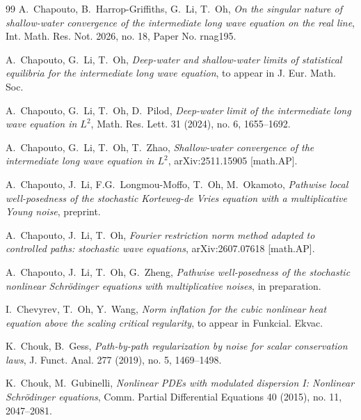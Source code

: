 \documentclass[letterpaper, 11pt,  reqno]{amsart}
\newcommand{\1}{\hspace{0.5mm}\text{I}\hspace{0.5mm}}
\numberwithin{equation}{section}
\numberwithin{theorem}{section}
\begin{document}
\begin{thebibliography}{99}
A.~Chapouto, B.~Harrop-Griffiths, G.~Li, T.~Oh,
{\it 
On the singular nature of shallow-water convergence of the intermediate long wave equation on the real line},
 Int. Math. Res. Not. 2026, no. 18, Paper No. rnag195. 






A.~Chapouto, G.~Li, T.~Oh, 
{\it
Deep-water and shallow-water limits
of statistical equilibria
for the intermediate long wave equation}, 
to appear in J. Eur. Math. Soc.



A.~Chapouto, G.~Li, T.~Oh, D.~Pilod,
{\it Deep-water limit of the intermediate long wave equation in $L^2$},
Math. Res. Lett.
 31 (2024), no. 6, 1655--1692. 



A.~Chapouto, G.~Li, T.~Oh, T.~Zhao, 
{\it
Shallow-water convergence of the intermediate long wave equation in $L^2$}, 
arXiv:2511.15905 [math.AP].





A.~Chapouto, J.~Li,  F.G.~Longmou-Moffo, T.~Oh, M.~Okamoto,
{\it Pathwise local well-posedness of the stochastic Korteweg-de Vries equation with a multiplicative Young noise}, preprint. 


A.~Chapouto, J.~Li, T.~Oh, 
{\it  Fourier restriction norm method adapted to controlled paths: stochastic wave equations},
arXiv:2607.07618 [math.AP].









A.~Chapouto, J.~Li, T.~Oh, G.~Zheng,
{\it  Pathwise well-posedness of the stochastic nonlinear Schr\"odinger equations with multiplicative noises},
in preparation.



I.~Chevyrev, T.~Oh, Y.~Wang, 
{\it 
Norm inflation for the cubic nonlinear heat equation above the scaling critical regularity}, 
to appear in Funkcial. Ekvac.

K.~Chouk, B.~Gess, 
{\it Path-by-path regularization by noise for scalar conservation laws}, 
J. Funct. Anal. 277 (2019), no. 5, 1469--1498. 




K.~Chouk, M.~Gubinelli, 
{\it Nonlinear PDEs with modulated dispersion I: Nonlinear Schr\"odinger equations},
Comm. Partial Differential Equations 40 (2015), no. 11, 2047--2081. 






\end{thebibliography}
\end{document}
